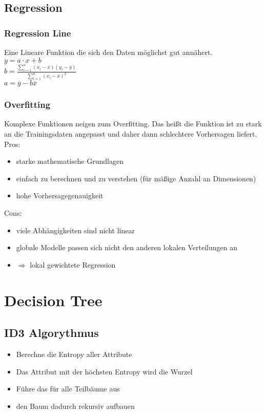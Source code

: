 \documentclass[a4paper]{scrartcl}
\begin{document}
\subsection{Regression}
\subsubsection{Regression Line}
Eine Lineare Funktion die sich den Daten möglichst gut annähert.\\
$ y = a\cdot x + b$\\
$b = \frac{\sum\limits^n _{i = 1} (x_i - \overline{x})(y_i - \overline{y})}{\sum\limits^n _{i = 1} (x_i - \overline{x})^2}$\\
$a = \overline{y} - b\overline{x} $

\subsubsection{Overfitting}
Komplexe Funktionen neigen zum Overfitting. Das heißt die Funktion ist zu stark an die Trainingsdaten angepasst und daher dann schlechtere Vorhersagen liefert.\\
Pros:
\begin{itemize}
\setlength{\parskip}{0pt}
\item starke mathematische Grundlagen
\item einfach zu berechnen und zu verstehen (für mäßige Anzahl an Dimensionen)
\item hohe Vorhersagegenauigkeit
\end{itemize} 
Cons:
\begin{itemize}
\setlength{\parskip}{0pt}
\item viele Abhängigkeiten sind nicht linear
\item globale Modelle passen sich nicht den anderen lokalen Verteilungen an
\item $\Rightarrow$ lokal gewichtete Regression
\end{itemize}

\section{Decision Tree}
\subsection{ID3 Algorythmus}
\begin{itemize}
\setlength{\parskip}{0pt}
\item Berechne die Entropy aller Attribute
\item Das Attribut mit der höchsten Entropy wird die Wurzel
\item Führe das für alle Teilbäume aus
\item den Baum dadurch rekursiv aufbauen
\end{itemize}
\end{document}
